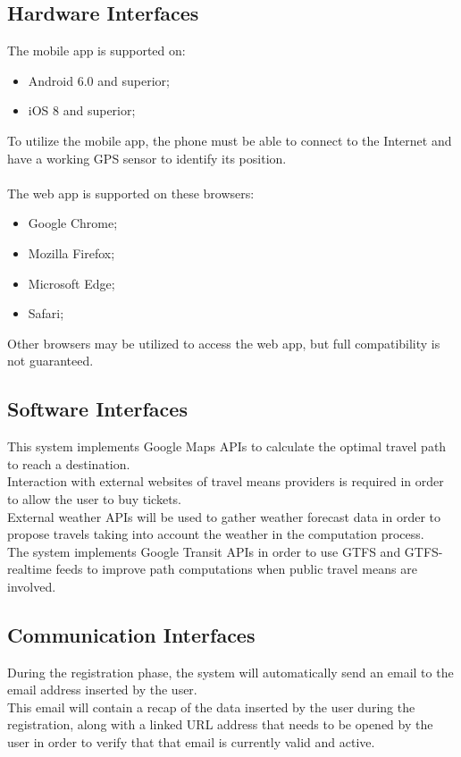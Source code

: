 \subsection{Hardware Interfaces}
\label{subsect:Hardware Interfaces}
	The mobile app is supported on:
	\begin{itemize}
		\item Android 6.0 and superior;
		\item iOS 8 and superior;
	\end{itemize}
	To utilize the mobile app, the phone must be able to connect to the Internet and have a working GPS sensor to identify its position. \\ \\
	The web app is supported on these browsers:
	\begin{itemize}
		\item Google Chrome;
		\item Mozilla Firefox;
		\item Microsoft Edge;
		\item Safari;
	\end{itemize}
	Other browsers may be utilized to access the web app, but full compatibility is not guaranteed.
\subsection{Software Interfaces}
\label{subsect:Software Interfaces}
	This system implements Google Maps APIs to calculate the optimal travel path to reach a destination. \\
	Interaction with external websites of travel means providers is required in order to allow the user to buy tickets. \\
	External weather APIs will be used to gather weather forecast data in order to propose travels taking into account the weather in the computation process. \\
	The system implements Google Transit APIs in order to use GTFS and GTFS-realtime feeds to improve path computations when public travel means are involved.
	
	
\subsection{Communication Interfaces}
\label{subsect:Communication Interfaces}
	During the registration phase, the system will automatically send an email to the email address inserted by the user. \\
	This email will contain a recap of the data inserted by the user during the registration, along with a linked URL address that needs to be opened by the user in order to verify that that email is currently valid and active.